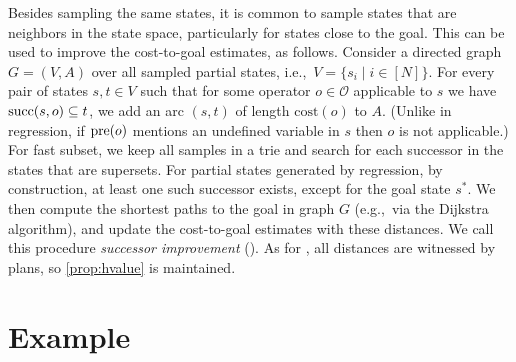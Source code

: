 Besides sampling the same states, it is common to sample states that are neighbors in the state space, particularly for states close to the goal. This can be used to improve the cost-to-goal estimates, as follows. Consider a directed graph $G=(V,A)$ over all sampled partial states, i.e.,~$V=\{s_i\mid i\in[N]\}$. For every pair of states $s,t\in V$ such that for some operator $o\in\mathcal{O}$ applicable to $s$ we have $\operatorname{succ}(s,o)\subseteq t$, we add an arc $(s,t)$ of length $\text{cost}(o)$ to $A$. (Unlike in regression, if $\operatorname{pre}(o)$ mentions an undefined variable in $s$ then $o$ is not applicable.) For fast subset, we keep all samples in a trie and search for each successor in the states that are supersets. For partial states generated by regression, by construction, at least one such successor exists, except for the goal state $s^*$. We then compute the shortest paths to the goal in graph $G$ (e.g.,~via the Dijkstra algorithm), and update the cost-to-goal estimates with these distances. We call this procedure \emph{successor improvement} (\hvfc). As for \hmin, all distances are witnessed by plans, so \cref{prop:hvalue} is maintained.

\section{Example}
\label{sec:example}

